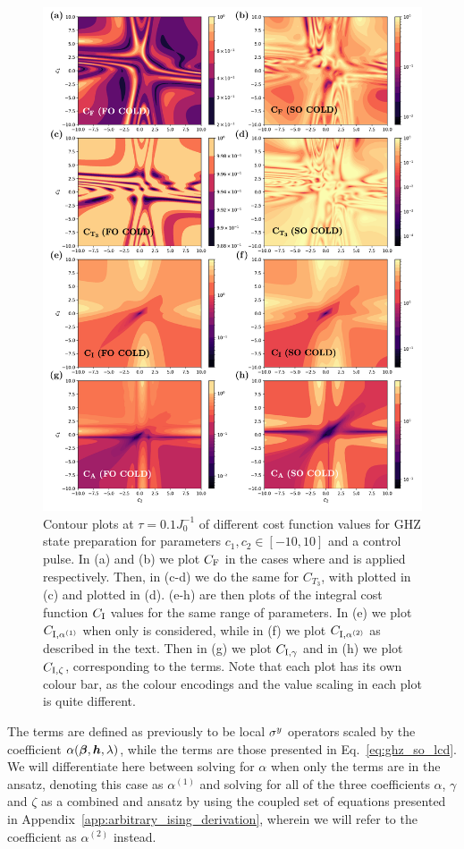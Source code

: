 \begin{figure}[t!]
    \centering
    \includegraphics[width=0.75\linewidth]{images/ghz_contour_integrals.png} \caption[Contour plots of cost function landscapes for GHZ state preparation in frustrated spin systems (integral cost function).]{Contour plots at $\tau = 0.1 J_0^{-1}$ of different cost function values for GHZ state preparation for parameters $c_1, c_2 \in [-10,10]$ and a  control pulse. In (a) and (b) we plot $C_{\rm F}$ in the cases where  and   is applied respectively. Then, in (c-d) we do the same for $C_{T_3}$, with   plotted in (c) and   plotted in (d). (e-h) are then plots of the integral cost function $C_{\rm I}$ values for the same range of parameters. In (e) we plot $C_{\rm I, \alpha^{(1)}}$ when only   is considered, while in (f) we plot $C_{\rm I, \alpha^{(2)}}$ as described in the text. Then in (g) we plot $C_{\rm I, \gamma}$ and in (h) we plot $C_{\rm I, \zeta}$, corresponding to the  terms. Note that each plot has its own colour bar, as the colour encodings and the value scaling in each plot is quite different.}\label{fig:ghz_contours}
\end{figure}

The   terms are defined as previously to be local $\sigma^y$ operators scaled by the coefficient $\alpha(\boldsymbol{\beta}, \boldsymbol{h}, \lambda)$, while the  terms are those presented in Eq.~\eqref{eq:ghz_so_lcd}. We will differentiate here between solving for $\alpha$ when only the  terms are in the  ansatz, denoting this case as $\alpha^{(1)}$ and solving for all of the three coefficients $\alpha$, $\gamma$ and $\zeta$ as a combined  and  ansatz by using the coupled set of equations presented in Appendix~\ref{app:arbitrary_ising_derivation}, wherein we will refer to the  coefficient as $\alpha^{(2)}$ instead.

